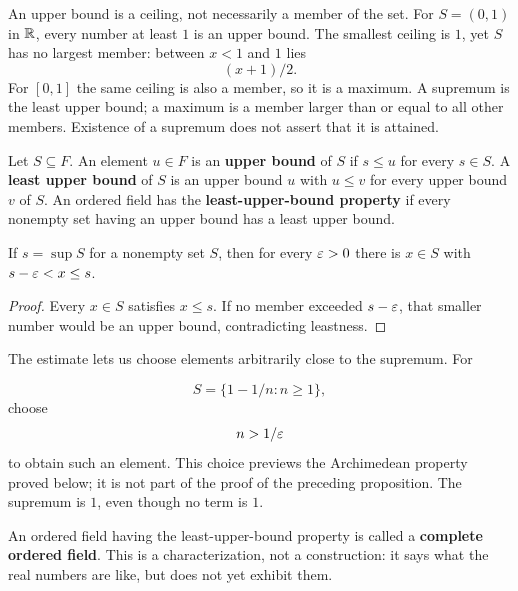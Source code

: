 An upper bound is a ceiling, not necessarily a member of the set.
For $S=(0,1)$ in $\mathbb{R}$, every number at least $1$ is an upper bound.
The smallest ceiling is $1$, yet $S$ has no largest member: between
$x<1$ and $1$ lies
\[
(x+1)/2.
\]
 For $[0,1]$ the same ceiling is also
a member, so it is a maximum. A supremum is the least upper bound;
a maximum is a member larger than or equal to all other members.
Existence of a supremum does not assert that it is attained.
\begin{definition}
Let $S\subseteq F$. An element $u\in F$ is an \textbf{upper bound} of $S$ if $s\leq u$ for every $s\in S$. A \textbf{least upper bound} of $S$ is an upper bound $u$ with $u\leq v$ for every upper bound $v$ of $S$. An ordered field has the \textbf{least-upper-bound property} if every nonempty set having an upper bound has a least upper bound.
\end{definition}
\begin{proposition}
If $s=\sup S$ for a nonempty set $S$, then for every $\varepsilon>0$ there
is $x\in S$ with $s-\varepsilon<x\leq s$.
\end{proposition}
\begin{proof}
Every $x\in S$ satisfies $x\leq s$. If no member exceeded $s-\varepsilon$,
that smaller number would be an upper bound, contradicting leastness.
\end{proof}
The estimate lets us choose elements arbitrarily close to the supremum. For

\[
S=\{1-1/n:n\geq1\},
\]
 choose
\[
n>1/\varepsilon
\]
 to obtain such an element.
This choice previews the Archimedean property proved below; it is not part
of the proof of the preceding proposition.
The supremum is $1$, even though no term is $1$.


\begin{definition}
An ordered field having the least-upper-bound property is called a \textbf{complete ordered field}. This is a characterization, not a construction: it says what the real numbers are like, but does not yet exhibit them.
\end{definition}

